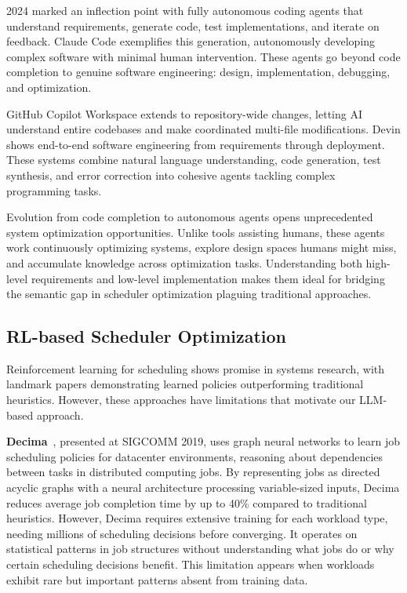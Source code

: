 2024 marked an inflection point with fully autonomous coding agents that understand requirements, generate code, test implementations, and iterate on feedback. Claude Code exemplifies this generation, autonomously developing complex software with minimal human intervention. These agents go beyond code completion to genuine software engineering: design, implementation, debugging, and optimization.

GitHub Copilot Workspace extends to repository-wide changes, letting AI understand entire codebases and make coordinated multi-file modifications. Devin shows end-to-end software engineering from requirements through deployment. These systems combine natural language understanding, code generation, test synthesis, and error correction into cohesive agents tackling complex programming tasks.

Evolution from code completion to autonomous agents opens unprecedented system optimization opportunities. Unlike tools assisting humans, these agents work continuously optimizing systems, explore design spaces humans might miss, and accumulate knowledge across optimization tasks. Understanding both high-level requirements and low-level implementation makes them ideal for bridging the semantic gap in scheduler optimization plaguing traditional approaches.

\subsection{RL-based Scheduler Optimization}

Reinforcement learning for scheduling shows promise in systems research, with landmark papers demonstrating learned policies outperforming traditional heuristics. However, these approaches have limitations that motivate our LLM-based approach.

\textbf{Decima}~\cite{mao2019decima}, presented at SIGCOMM 2019, uses graph neural networks to learn job scheduling policies for datacenter environments, reasoning about dependencies between tasks in distributed computing jobs. By representing jobs as directed acyclic graphs with a neural architecture processing variable-sized inputs, Decima reduces average job completion time by up to 40\% compared to traditional heuristics. However, Decima requires extensive training for each workload type, needing millions of scheduling decisions before converging. It operates on statistical patterns in job structures without understanding what jobs do or why certain scheduling decisions benefit. This limitation appears when workloads exhibit rare but important patterns absent from training data.

